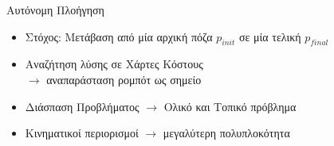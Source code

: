 \documentclass[10pt, compress, handout]{beamer} %
\begin{document}
\begin{frame}{Αυτόνομη Πλοήγηση}
	\begin{itemize}
		\item Στόχος: Μετάβαση από μία αρχική πόζα $p_{init}$ σε μία τελική $p_{final}$
		\item	Αναζήτηση λύσης σε Χάρτες Κόστους\\ $\rightarrow$ αναπαράσταση ρομπότ ως  σημείο
		\item Διάσπαση Προβλήματος $\rightarrow$ Ολικό και Τοπικό πρόβλημα
		\item Κινηματικοί περιορισμοί $\rightarrow$ μεγαλύτερη πολυπλοκότητα
	\end{itemize}
	\vspace{-0.5cm}
	\begin{figure}
		\centering
	\end{figure}
\end{frame}
\end{document}
